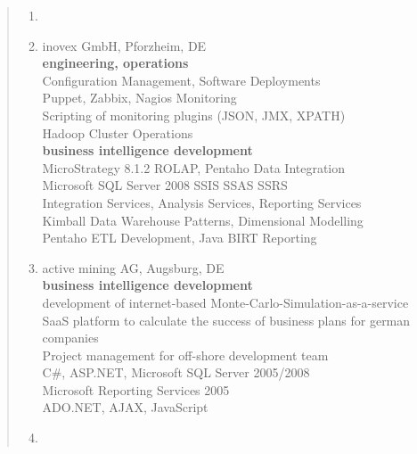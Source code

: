 \documentclass[a4paper]{report}
\begin{document}
\begin{quote}
\begin{enumerate}
\item[ ]

\item[2008 - 2013]
                    inovex GmbH, Pforzheim, DE\\
                    \textbf{engineering, operations}\\
                    Configuration Management, Software Deployments\\
                    Puppet, Zabbix, Nagios Monitoring\\
                    Scripting of monitoring plugins (JSON, JMX, XPATH)\\
                    Hadoop Cluster Operations\\
                    \textbf{business intelligence development}\\
                    MicroStrategy 8.1.2 ROLAP, Pentaho Data Integration\\
                    Microsoft SQL Server 2008 SSIS SSAS SSRS\\
                    Integration Services, Analysis Services, Reporting Services\\
                    Kimball Data Warehouse Patterns, Dimensional Modelling\\
                    Pentaho ETL Development, Java BIRT Reporting

\clearpage

\item[2008]         active mining AG, Augsburg, DE\\
                    \textbf{business intelligence development}\\
                    development of internet-based Monte-Carlo-Simulation-as-a-service SaaS platform to calculate the success of business plans for german companies\\
                    Project management for off-shore development team\\
                    C\#, ASP.NET, Microsoft SQL Server 2005/2008\\
                    Microsoft Reporting Services 2005\\
                    ADO.NET, AJAX, JavaScript

\item[ ]


\end{enumerate}
\end{quote}
\end{document}
